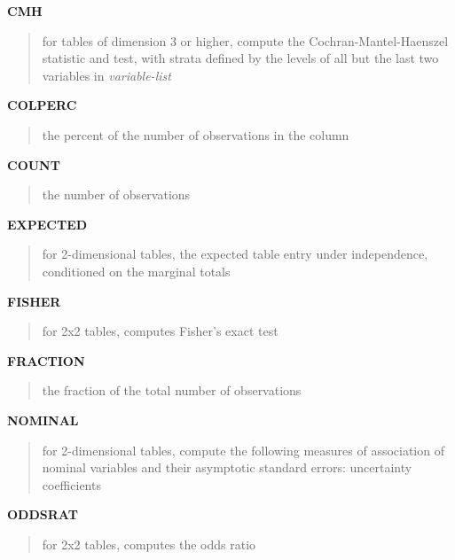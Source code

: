 \documentclass{book}
\newcommand\Texinfocommandstyletextvar[1]{{\normalfont{}\textsl{#1}}}%
\renewcommand{\_}{\Texinfounderscore\discretionary{}{}{}}
\begin{document}
\textbf{CMH}
%
%
\begin{quote}
for tables of dimension 3 or higher, compute the Cochran-Mantel-Haenszel statistic and test,
with strata defined by the levels of all but the last two variables in
\Texinfocommandstyletextvar{variable-list}
\end{quote}

\textbf{COLPERC}
%
%
\begin{quote}
the percent of the number of observations in the column
\end{quote}

\textbf{COUNT}
%
\begin{quote}
the number of observations
\end{quote}

\textbf{EXPECTED}
%
%
\begin{quote}
for 2-dimensional tables, the expected table entry under independence,
conditioned on the marginal totals
\end{quote}

\textbf{FISHER}
%
%
\begin{quote}
for 2x2 tables, computes Fisher's exact test
\end{quote}

\textbf{FRACTION}
%
\begin{quote}
the fraction of the total number of observations
\end{quote}

\textbf{NOMINAL}
%
%
%
%
\begin{quote}
for 2-dimensional tables, compute the following measures of association of nominal variables and their asymptotic standard errors: uncertainty coefficients
\end{quote}

\textbf{ODDSRAT}
%
\begin{quote}
for 2x2 tables, computes the odds ratio
\end{quote}
\end{document}
